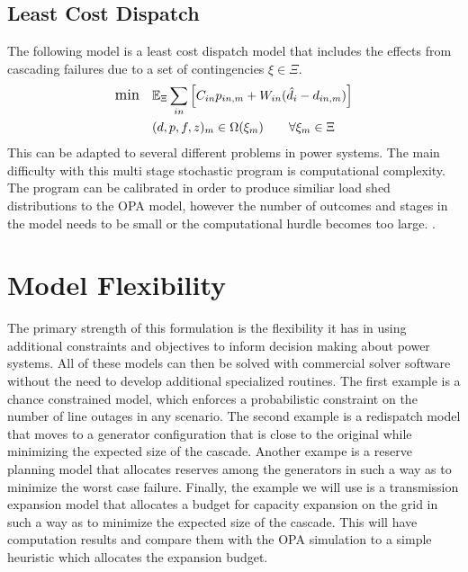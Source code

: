 \subsection{Least Cost Dispatch}
The following model is a least cost dispatch model that includes the effects from cascading failures due to a set of contingencies $\xi\in\Xi$.  
\begin{subequations}
\label{leastcost}
\begin{align} \displaystyle
	{\large \mbox{min}} \hspace{10px} &  \Expect_\Xi \sum_{in} \left[ C_{in}  p_{in,m}  + W_{in} (\hat{d}_{i} - d_{in,m}) \right]	\\
	&(d,p,f,z)_m  \in \Omega(\xi_m)    \hspace{20px}   \forall \xi_m \in \Xi	
\end{align}
\end{subequations}
This can be adapted to several different problems in power systems.  The main difficulty with this multi stage stochastic program is computational complexity.  The program can be calibrated in order to produce similiar load shed distributions to the OPA model, however the number of outcomes and stages in the model needs to be small or the computational hurdle becomes too large.
.


\section{Model Flexibility}
The primary strength of this formulation is the flexibility it has in using additional constraints and objectives to inform decision making about power systems.  All of these models can then be solved with commercial solver software without the need to develop additional specialized routines.  The first example is a chance constrained model, which enforces a probabilistic constraint on the number of line outages in any scenario. \endnote{}  The second example is a redispatch model that moves to a generator configuration that is close to the original while minimizing the expected size of the cascade.\endnote{}  Another exampe is a reserve planning model that allocates reserves among the generators in such a way as to minimize the worst case failure.\endnote{}  Finally, the example we will use is a transmission expansion model that allocates a budget for capacity expansion on the grid in such a way as to minimize the expected size of the cascade.  This will have computation results and compare them with the OPA simulation to a simple heuristic which allocates the expansion budget.




